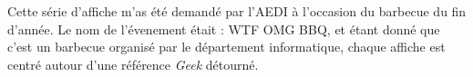         \begin{center}
            Cette série d'affiche m'as été demandé par l'AEDI à l'occasion du barbecue du fin d'année.
            Le nom de l'évenement était : WTF OMG BBQ, et étant donné que c'est un barbecue organisé par le département informatique, chaque affiche est centré autour d'une référence \emph{Geek} détourné.
        \end{center}
        
